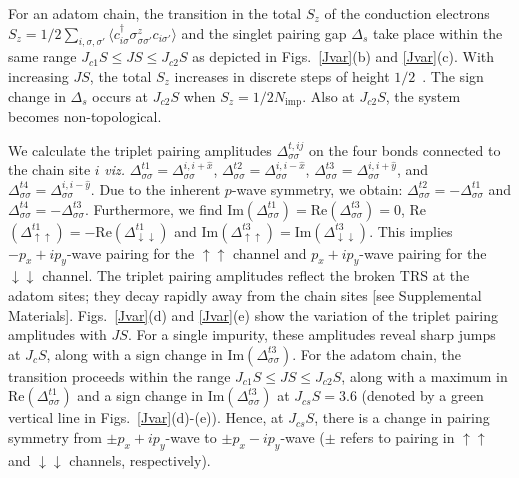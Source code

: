 \documentclass[aps,prl,reprint,nobibnotes]{revtex4-1}
\begin{document}
For an adatom chain, the transition in the total $S_z$ of the conduction electrons $S_z=1/2\sum_{i,\sigma,\sigma'} \langle c_{i\sigma}^{\dagger} \sigma_{\sigma \sigma'}^z c_{i\sigma'} \rangle$ and the singlet pairing gap $\Delta_s$ take place within the same range $J_{c1}S \leq JS \leq J_{c2}S$ as depicted in Figs.~\ref{Jvar}(b) and \ref{Jvar}(c). With increasing $JS$, the total $S_z$ increases in discrete steps of height $1/2$~\cite{PhysRevB.73.224511}. The sign change in $\Delta_s$ occurs at $J_{c2}S$ when $S_z=1/2N_{\text{imp}}$. Also at $J_{c2}S$, the system becomes non-topological. 

We calculate the triplet pairing amplitudes $\Delta_{\sigma \sigma}^{t,ij}$ on the four bonds connected to the chain site $i$ \textit{viz.} $\Delta_{\sigma \sigma}^{t1}=\Delta_{\sigma \sigma}^{i,i+\hat{x}}$, $\Delta_{\sigma \sigma}^{t2}=\Delta_{\sigma \sigma}^{i,i-\hat{x}}$, $\Delta_{\sigma \sigma}^{t3}=\Delta_{\sigma \sigma}^{i,i+\hat{y}}$, and $\Delta_{\sigma \sigma}^{t4}=\Delta_{\sigma \sigma}^{i,i-\hat{y}}$. Due to the inherent $p$-wave symmetry, we obtain: $\Delta_{\sigma \sigma}^{t2}=-\Delta_{\sigma \sigma}^{t1}$ and $\Delta_{\sigma \sigma}^{t4}=-\Delta_{\sigma \sigma}^{t3}$. Furthermore, we find Im$(\Delta_{\sigma \sigma}^{t1})= $Re$(\Delta_{\sigma \sigma}^{t3})= 0$, Re$(\Delta_{\uparrow \uparrow}^{t1})=-\text{Re}(\Delta_{\downarrow \downarrow}^{t1})$ and Im$(\Delta_{\uparrow \uparrow}^{t3})=\text{Im}(\Delta_{\downarrow \downarrow}^{t3})$. This implies $-p_x+ip_y$-wave pairing for the $\uparrow \uparrow$ channel and $p_x+ip_y$-wave pairing for the $\downarrow \downarrow$ channel. The triplet pairing amplitudes reflect the broken TRS at the adatom sites; they decay rapidly away from the chain sites [see Supplemental Materials]. Figs.~\ref{Jvar}(d) and \ref{Jvar}(e) show the variation of the triplet pairing amplitudes with $JS$. For a single impurity, these amplitudes reveal sharp jumps at $J_cS$, along with a sign change in Im$(\Delta_{\sigma \sigma}^{t3})$. For the adatom chain, the transition proceeds within the range $J_{c1}S \leq JS \leq J_{c2}S$, along with a maximum in Re$(\Delta_{\sigma \sigma}^{t1})$ and a sign change in Im$(\Delta_{\sigma \sigma}^{t3})$ at $J_{cs}S=3.6$ (denoted by a green vertical line in Figs.~\ref{Jvar}(d)-(e)). Hence, at $J_{cs}S$, there is a change in pairing symmetry from $\pm p_x+ip_y$-wave to $\pm p_x-ip_y$-wave ($\pm$ refers to pairing in $\uparrow \uparrow$ and $\downarrow \downarrow$ channels, respectively).
\end{document}
